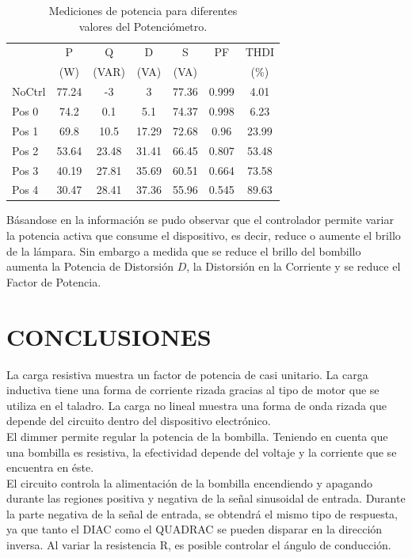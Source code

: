 \documentclass[journal]{IEEEtran}
\begin{document}
\begin{table}[h]
\begin{tabular}{|p{1.2cm}|c|c|c|c|c|c|}
\hline 
 & P  & Q  & D  & S  & PF & THDI  \\
 &(W) & (VAR) &(VA) & (VA) &  & (\%) \\ \hline  
NoCtrl & 77.24 & -3 & 3 & 77.36 & 0.999 & 4.01 \\ 
\hline 
Pos 0 & 74.2 & 0.1 & 5.1 & 74.37 & 0.998 & 6.23 \\ 
\hline 
Pos 1 & 69.8 & 10.5 & 17.29 & 72.68 & 0.96 & 23.99 \\
\hline 
Pos 2 & 53.64 & 23.48 & 31.41 & 66.45 & 0.807 & 53.48 \\
\hline 
Pos 3 & 40.19 & 27.81 & 35.69 & 60.51 & 0.664 & 73.58 \\ 
\hline
Pos 4 & 30.47 & 28.41 & 37.36 & 55.96 & 0.545 & 89.63 \\ 
\hline 
\end{tabular}
\caption{Mediciones de potencia para diferentes \\ valores 
del Potenciómetro.}
\label{table:controller}
\end{table}

Básandose en la información se pudo observar que el 
controlador permite variar la potencia activa que 
consume el dispositivo, es decir, reduce o aumente 
el brillo de la lámpara. Sin embargo a medida que se 
reduce el brillo del bombillo aumenta la Potencia de 
Distorsión $D$, la Distorsión en la Corriente y se 
reduce el Factor de Potencia. 

\section{CONCLUSIONES}

La carga resistiva muestra un factor de potencia de 
casi unitario. La carga inductiva tiene una forma de 
corriente rizada gracias al tipo de motor que se 
utiliza en el taladro. La carga no lineal muestra 
una forma de onda rizada que depende del circuito 
dentro del dispositivo electrónico. \\

El dimmer permite regular la potencia de la bombilla. 
Teniendo en cuenta que una bombilla es resistiva, la 
efectividad depende del voltaje y la corriente que se 
encuentra en éste. \\

El circuito controla la alimentación de la bombilla 
encendiendo y apagando durante las regiones positiva y 
negativa de la señal sinusoidal de entrada. Durante 
la parte negativa de la señal de entrada, se obtendrá 
el mismo tipo de respuesta, ya que tanto el DIAC como 
el QUADRAC se pueden disparar en la dirección inversa. 
Al variar la resistencia R, es posible controlar el
ángulo de conducción.\\
\end{document}
